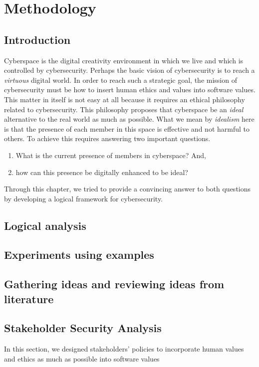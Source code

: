 \chapter{Methodology}
\section{Introduction}
Cyberspace is the digital creativity environment in which we live and which is controlled by cybersecurity.  Perhaps the basic vision of cybersecurity is to reach a \emph{virtuous} digital world.  In order to reach such a strategic goal, the mission of cybersecurity must be how to insert human ethics and values into software values.  This matter in itself is not easy at all because it requires an ethical philosophy related to cybersecurity.  This philosophy proposes that cyberspace be an \emph{ideal} alternative to the real world as much as possible.  What we mean by \emph{idealism} here is that the presence of each member in this space is effective and not harmful to others.  To achieve this requires answering two important questions.
\begin{enumerate}
\item What is the current presence of members in cyberspace? And,
\item how can this presence be digitally enhanced to be ideal?
\end{enumerate}
      Through this chapter, we tried to provide a convincing answer to both questions by developing a  logical framework for cybersecurity. %

\section{Logical analysis}

\section{Experiments using examples}

\section{Gathering ideas and reviewing ideas from literature}

\section{Stakeholder Security Analysis}
In this section, we designed stakeholders' policies to incorporate human
values and ethics as much as possible into software values

\iffalse
\section{A social contract for cyberspace}
We proposed a social contract for cyberspace that can manage Stakeholders'
policies and ensure their respect by their owners.
\fi

